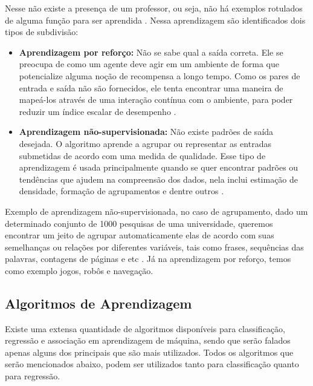 \par
Nesse não existe a presença de um professor, ou seja, não há exemplos rotulados de alguma função para ser aprendida \cite{Lorena2007, Henke2011}. Nessa aprendizagem são identificados dois tipos de subdivisão:

\begin{itemize}
    \item \textbf{Aprendizagem por reforço:} Não se sabe qual a saída correta. Ele se preocupa de como um agente deve agir em um ambiente de forma que potencialize alguma noção de recompensa a longo tempo. Como os pares de entrada e saída não são fornecidos, ele tenta encontrar uma maneira de mapeá-los através de uma interação contínua com o ambiente, para poder reduzir um índice escalar de desempenho \cite{Henke2011, Alpaydin2009}. 
    \item \textbf{Aprendizagem não-supervisionada:} Não existe padrões de saída desejada. O algoritmo aprende a agrupar ou representar as entradas submetidas de acordo com uma medida de qualidade. Esse tipo de aprendizagem é usada principalmente quando se quer encontrar padrões ou tendências que ajudem na compreensão dos dados, nela inclui estimação de densidade, formação de agrupamentos e dentre outros \cite{Henke2011, Lorena2007}.
\end{itemize}

\par
Exemplo de aprendizagem não-supervisionada, no caso de agrupamento, dado um determinado conjunto de 1000 pesquisas de uma universidade, queremos encontrar um jeito de agrupar automaticamente elas de acordo com suas semelhanças ou relações por diferentes variáveis, tais como frases, sequências das palavras, contagens de páginas e etc \cite{Pedro}. Já na aprendizagem por reforço, temos como exemplo jogos, robôs e navegação.


\subsection{Algoritmos de Aprendizagem}

\par
Existe uma extensa quantidade de algoritmos disponíveis para classificação, regressão e associação em aprendizagem de máquina, sendo que serão falados apenas alguns dos principais que são mais utilizados. Todos os algoritmos que serão mencionados abaixo, podem ser utilizados tanto para classificação quanto para regressão. %


